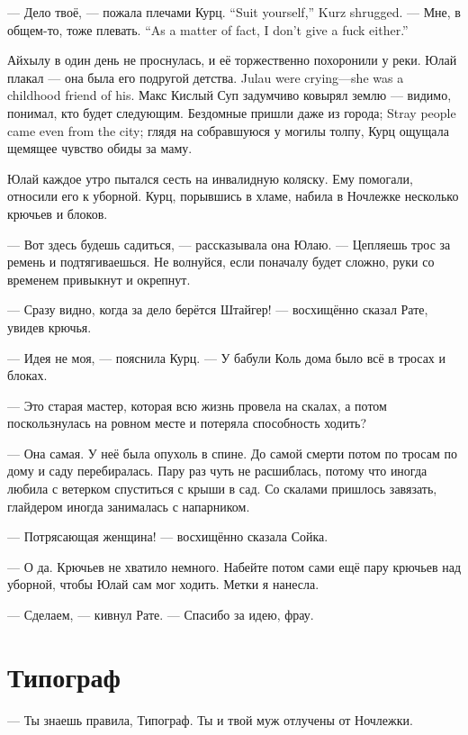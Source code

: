 {--- Дело твоё, --- пожала плечами Курц.}
{``Suit yourself,'' Kurz shrugged.}
{--- Мне, в общем-то, тоже плевать.}
{``As a matter of fact, I don't give a fuck either.''}

Айхылу в один день не проснулась, и её торжественно похоронили у реки.
{Юлай плакал --- она была его подругой детства.}
{Julau were crying---she was a childhood friend of his.}
Макс Кислый Суп задумчиво ковырял землю --- видимо, понимал, кто будет следующим.
{Бездомные пришли даже из города;}
{Stray people came even from the city;}
глядя на собравшуюся у могилы толпу, Курц ощущала щемящее чувство обиды за маму.

\textspace

Юлай каждое утро пытался сесть на инвалидную коляску.
Ему помогали, относили его к уборной.
Курц, порывшись в хламе, набила в Ночлежке несколько крючьев и блоков.

--- Вот здесь будешь садиться, --- рассказывала она Юлаю.
--- Цепляешь трос за ремень и подтягиваешься.
Не волнуйся, если поначалу будет сложно, руки со временем привыкнут и окрепнут.

--- Сразу видно, когда за дело берётся Штайгер! --- восхищённо сказал Рате, увидев крючья.

--- Идея не моя, --- пояснила Курц.
--- У бабули Коль дома было всё в тросах и блоках.

--- Это старая мастер, которая всю жизнь провела на скалах, а потом поскользнулась на ровном месте и потеряла способность ходить?

--- Она самая.
У неё была опухоль в спине.
До самой смерти потом по тросам по дому и саду перебиралась.
Пару раз чуть не расшиблась, потому что иногда любила с ветерком спуститься с крыши в сад.
Со скалами пришлось завязать, глайдером иногда занималась с напарником.

--- Потрясающая женщина! --- восхищённо сказала Сойка.

--- О да.
Крючьев не хватило немного.
Набейте потом сами ещё пару крючьев над уборной, чтобы Юлай сам мог ходить.
Метки я нанесла.

--- Сделаем, --- кивнул Рате.
--- Спасибо за идею, фрау.

\section{Типограф}

--- Ты знаешь правила, Типограф.
Ты и твой муж отлучены от Ночлежки.

